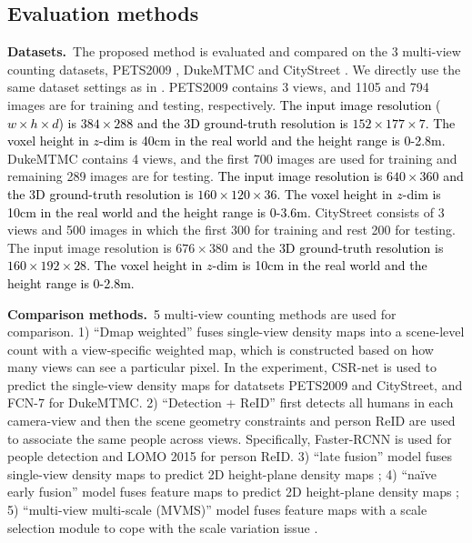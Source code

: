 \documentclass[letterpaper]{article} %
\newcommand{\zq}[1]{\textcolor{black}{#1}} %
\newcommand{\citep}{\cite}
\newcommand{\citealp}[1]{\citeauthor{#1} \citeyear{#1}}
\begin{document}
\subsection{Evaluation methods}
\textbf{Datasets.}~The proposed method is evaluated and compared on the 3 multi-view counting datasets, PETS2009 \citep{ferryman2009pets2009}, DukeMTMC \citep{ristani2016MTMC} and CityStreet \citep{zhang2019wide}. We directly use the same dataset settings as in \citealp{zhang2019wide}.
PETS2009 contains 3 views,
and 1105 and 794 images are for training and testing, respectively.
\zq{The input image resolution ($w \! \times \! h \! \times \! d$) is  $384\! \times \!288$ and the 3D ground-truth resolution is $152\!\times\!177 \!\times\! 7$. The voxel height in $z$-dim is 40cm in the real world and the height range is 0-2.8m.}
DukeMTMC \citep{ristani2016MTMC} contains 4 views, and the first 700 images are used for training and remaining 289 images are for testing. \zq{The input image resolution is  $640\! \times \!360$ and the 3D ground-truth resolution is $160\!\times\!120 \!\times\! 36$. The voxel height in $z$-dim is 10cm in the real world and the height range is 0-3.6m.
}
CityStreet \citep{zhang2019wide} consists of 3 views and 500 images in which the first 300 for training and rest 200 for testing. The input image resolution is  $676\! \times \!380$ and the \zq{3D ground-truth resolution is $160\!\times\!192 \!\times\! 28$. The voxel height in $z$-dim is 10cm in the real world and the height range is 0-2.8m.}

\textbf{Comparison methods.}~5 multi-view counting methods are used for comparison.
1) ``Dmap weighted'' fuses single-view density maps into a scene-level count with a view-specific weighted map, which is constructed based on how many views can see a particular pixel. In the experiment, CSR-net \citep{li2018csrnet} is used to predict the single-view density maps for datatsets PETS2009 and CityStreet, and FCN-7 for DukeMTMC.
2) ``Detection + ReID''  first detects all humans in each camera-view and then the scene geometry constraints and person ReID are used to associate the same people across views. Specifically, Faster-RCNN \citep{ren2015faster} is used for people detection and LOMO 2015 \citep{liao2015person} for person ReID.
3) ``late fusion'' model fuses single-view density maps to predict 2D height-plane density maps \citep{zhang2019wide};
4) ``na\"ive early fusion'' model fuses feature maps to predict 2D height-plane density maps \citep{zhang2019wide};
5) ``multi-view multi-scale (MVMS)'' model fuses feature maps with a scale selection module to cope with the scale variation issue \citep{zhang2019wide}.
\end{document}
